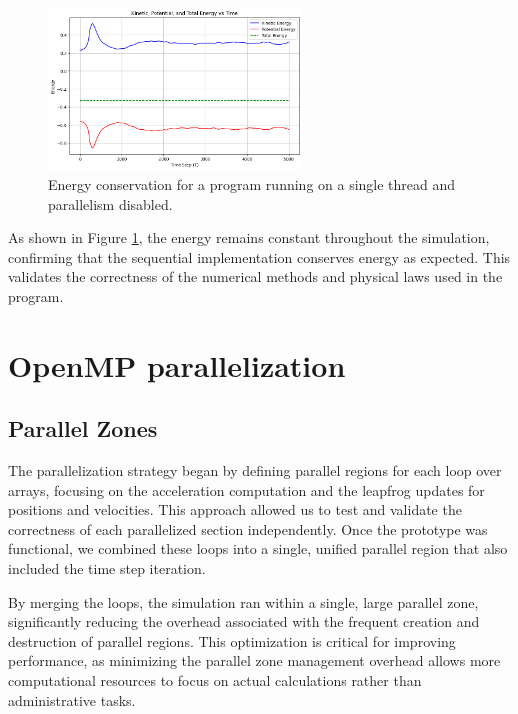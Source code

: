 \documentclass[english,11pt]{article}
\begin{document}
\begin{figure}[h!]
    \centering
    \includegraphics[width=0.6\textwidth]{graph/E_con.png}
    \caption{Energy conservation for a program running on a single thread and parallelism disabled.}
    \label{fig:energy_conservation}
\end{figure}

As shown in Figure \ref{fig:energy_conservation}, the energy remains constant throughout the simulation, confirming that the sequential implementation conserves energy as expected. This validates the correctness of the numerical methods and physical laws used in the program.



\section{OpenMP parallelization}

\subsection{Parallel Zones}

The parallelization strategy began by defining parallel regions for each loop over arrays, focusing on the acceleration computation and the leapfrog updates for positions and velocities. This approach allowed us to test and validate the correctness of each parallelized section independently. Once the prototype was functional, we combined these loops into a single, unified parallel region that also included the time step iteration. 

By merging the loops, the simulation ran within a single, large parallel zone, significantly reducing the overhead associated with the frequent creation and destruction of parallel regions. This optimization is critical for improving performance, as minimizing the parallel zone management overhead allows more computational resources to focus on actual calculations rather than administrative tasks.
\end{document}
